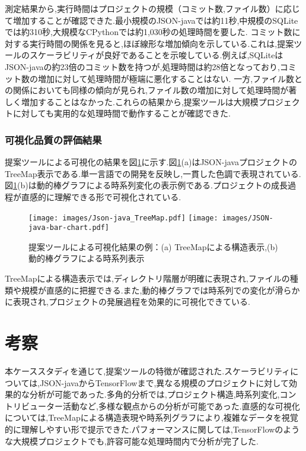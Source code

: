 \documentclass[12pt,twoside]{jbook}
\begin{document}
測定結果から,実行時間はプロジェクトの規模（コミット数,ファイル数）に応じて増加することが確認できた.最小規模のJSON-javaでは約11秒,中規模のSQLiteでは約310秒,大規模なCPythonでは約1,030秒の処理時間を要した.
コミット数に対する実行時間の関係を見ると,ほぼ線形な増加傾向を示している.これは,提案ツールのスケーラビリティが良好であることを示唆している.例えば,SQLiteはJSON-javaの約23倍のコミット数を持つが,処理時間は約28倍となっており,コミット数の増加に対して処理時間が極端に悪化することはない.
一方,ファイル数との関係においても同様の傾向が見られ,ファイル数の増加に対して処理時間が著しく増加することはなかった.これらの結果から,提案ツールは大規模プロジェクトに対しても実用的な処理時間で動作することが確認できた.

\subsection{可視化品質の評価結果}
提案ツールによる可視化の結果を図\ref{fig:visualization-results}に示す.図\ref{fig:visualization-results}(a)はJSON-javaプロジェクトのTreeMap表示である.単一言語での開発を反映し,一貫した色調で表現されている.図\ref{fig:visualization-results}(b)は動的棒グラフによる時系列変化の表示例である.プロジェクトの成長過程が直感的に理解できる形で可視化されている.
\begin{figure}[htbp]
  \centering
  \texttt{[image: images/Json-java\_TreeMap.pdf]}
  \texttt{[image: images/JSON-java-bar-chart.pdf]}
  \caption{提案ツールによる可視化結果の例：(a) TreeMapによる構造表示,(b) 動的棒グラフによる時系列表示}
  \label{fig:visualization-results}
\end{figure}

TreeMapによる構造表示では,ディレクトリ階層が明確に表現され,ファイルの種類や規模が直感的に把握できる.また,動的棒グラフでは時系列での変化が滑らかに表現され,プロジェクトの発展過程を効果的に可視化できている.

\chapter{考察}
本ケーススタディを通じて,提案ツールの特徴が確認された.スケーラビリティについては,JSON-javaからTensorFlowまで,異なる規模のプロジェクトに対して効果的な分析が可能であった.多角的分析では,プロジェクト構造,時系列変化,コントリビューター活動など,多様な観点からの分析が可能であった.直感的な可視化については,TreeMapによる構造表現や時系列グラフにより,複雑なデータを視覚的に理解しやすい形で提示できた.パフォーマンスに関しては,TensorFlowのような大規模プロジェクトでも,許容可能な処理時間内で分析が完了した.
\end{document}
